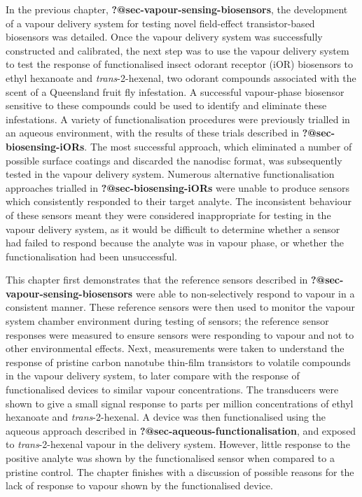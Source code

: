 \documentclass[
  a4paper,
]{scrbook}
\begin{document}
In the previous chapter, \textbf{?@sec-vapour-sensing-biosensors}, the
development of a vapour delivery system for testing novel field-effect
transistor-based biosensors was detailed. Once the vapour delivery
system was successfully constructed and calibrated, the next step was to
use the vapour delivery system to test the response of functionalised
insect odorant receptor (iOR) biosensors to ethyl hexanoate and
\emph{trans}-2-hexenal, two odorant compounds associated with the scent
of a Queensland fruit fly infestation. A successful vapour-phase
biosensor sensitive to these compounds could be used to identify and
eliminate these infestations. A variety of functionalisation procedures
were previously trialled in an aqueous environment, with the results of
these trials described in \textbf{?@sec-biosensing-iORs}. The most
successful approach, which eliminated a number of possible surface
coatings and discarded the nanodisc format, was subsequently tested in
the vapour delivery system. Numerous alternative functionalisation
approaches trialled in \textbf{?@sec-biosensing-iORs} were unable to
produce sensors which consistently responded to their target analyte.
The inconsistent behaviour of these sensors meant they were considered
inappropriate for testing in the vapour delivery system, as it would be
difficult to determine whether a sensor had failed to respond because
the analyte was in vapour phase, or whether the functionalisation had
been unsuccessful.

This chapter first demonstrates that the reference sensors described in
\textbf{?@sec-vapour-sensing-biosensors} were able to non-selectively
respond to vapour in a consistent manner. These reference sensors were
then used to monitor the vapour system chamber environment during
testing of sensors; the reference sensor responses were measured to
ensure sensors were responding to vapour and not to other environmental
effects. Next, measurements were taken to understand the response of
pristine carbon nanotube thin-film transistors to volatile compounds in
the vapour delivery system, to later compare with the response of
functionalised devices to similar vapour concentrations. The transducers
were shown to give a small signal response to parts per million
concentrations of ethyl hexanoate and \emph{trans}-2-hexenal. A device
was then functionalised using the aqueous approach described in
\textbf{?@sec-aqueous-functionalisation}, and exposed to
\emph{trans}-2-hexenal vapour in the delivery system. However, little
response to the positive analyte was shown by the functionalised sensor
when compared to a pristine control. The chapter finishes with a
discussion of possible reasons for the lack of response to vapour shown
by the functionalised device.
\end{document}
